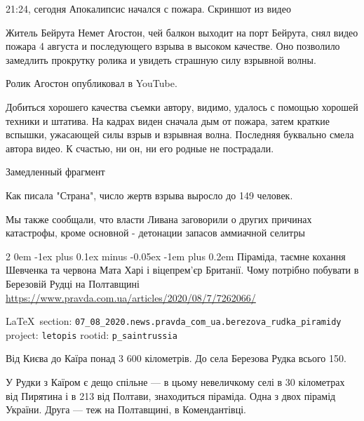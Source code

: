 \documentclass[a4paper,11pt]{extreport}
\makeatletter
\renewcommand\subsection{%
  \clearpage
    \@startsection{subsection}%
    {2}%
    {0em}%
    {-1ex plus 0.1ex minus -0.05ex}%
    {-1em plus 0.2em}%
    {\scshape\bfseries\Large}%
}
\makeatother
\begin{document}
21:24, сегодня Апокалипсис начался с пожара. Скриншот из видео 

Житель Бейрута Немет Агостон, чей балкон выходит на порт Бейрута, снял видео
пожара 4 августа и последующего взрыва в высоком качестве. Оно позволило
замедлить прокрутку ролика и увидеть страшную силу взрывной волны.

Ролик Агостон опубликовал в YouTube.

Добиться хорошего качества съемки автору, видимо, удалось с помощью хорошей
техники и штатива. На кадрах виден сначала дым от пожара, затем краткие
вспышки, ужасающей силы взрыв и взрывная волна. Последняя буквально смела
автора видео. К счастью, ни он, ни его родные не пострадали.

Замедленный фрагмент

Как писала "Страна", число жертв взрыва выросло до 149 человек.

Мы также сообщали, что власти Ливана заговорили о других причинах катастрофы,
кроме основной - детонации запасов аммиачной селитры
  
 
 
\subsection{Піраміда, таємне кохання Шевченка та червона Мата Харі і віцепрем'єр Британії. Чому потрібно побувати в Березовій Рудці на Полтавщині}
\label{sec:07_08_2020.news.pravda_com_ua.berezova_rudka_piramidy}
\url{https://www.pravda.com.ua/articles/2020/08/7/7262066/}
  
\vspace{0.5cm}
 {\ifDEBUG\small\LaTeX~section: \verb|07_08_2020.news.pravda_com_ua.berezova_rudka_piramidy| project: \verb|letopis| rootid: \verb|p_saintrussia| \fi}
\vspace{0.5cm}

Від Києва до Каїра понад 3 600 кілометрів. До села Березова Рудка всього 150.

У Рудки з Каїром є дещо спільне --- в цьому невеличкому селі в 30 кілометрах від
Пирятина і в 213 від Полтави, знаходиться піраміда. Одна з двох пірамід
України. Друга --- теж на Полтавщині, в Комендантівці.
\end{document}
